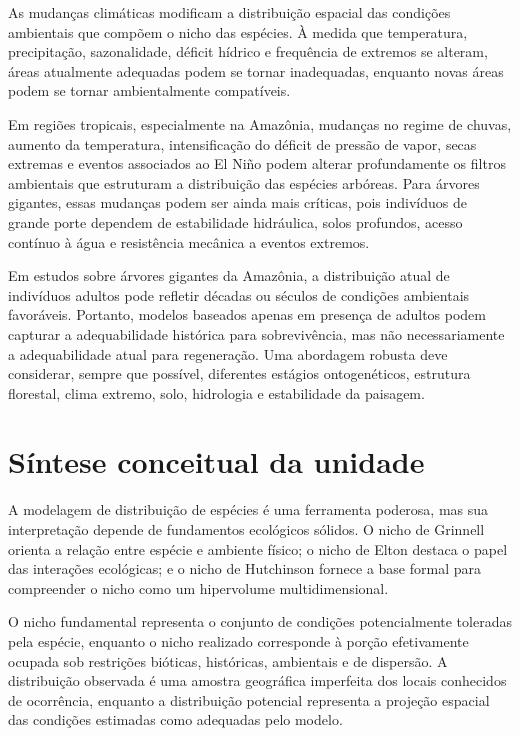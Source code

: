 \documentclass{ueap-sdm}
\begin{document}
As mudanças climáticas modificam a distribuição espacial das condições ambientais que compõem o nicho das espécies. À medida que temperatura, precipitação, sazonalidade, déficit hídrico e frequência de extremos se alteram, áreas atualmente adequadas podem se tornar inadequadas, enquanto novas áreas podem se tornar ambientalmente compatíveis.

Em regiões tropicais, especialmente na Amazônia, mudanças no regime de chuvas, aumento da temperatura, intensificação do déficit de pressão de vapor, secas extremas e eventos associados ao El Niño podem alterar profundamente os filtros ambientais que estruturam a distribuição das espécies arbóreas. Para árvores gigantes, essas mudanças podem ser ainda mais críticas, pois indivíduos de grande porte dependem de estabilidade hidráulica, solos profundos, acesso contínuo à água e resistência mecânica a eventos extremos.

\begin{aplicacao}
Em estudos sobre árvores gigantes da Amazônia, a distribuição atual de indivíduos adultos pode refletir décadas ou séculos de condições ambientais favoráveis. Portanto, modelos baseados apenas em presença de adultos podem capturar a adequabilidade histórica para sobrevivência, mas não necessariamente a adequabilidade atual para regeneração. Uma abordagem robusta deve considerar, sempre que possível, diferentes estágios ontogenéticos, estrutura florestal, clima extremo, solo, hidrologia e estabilidade da paisagem.
\end{aplicacao}

\section{Síntese conceitual da unidade}

A modelagem de distribuição de espécies é uma ferramenta poderosa, mas sua interpretação depende de fundamentos ecológicos sólidos. O nicho de Grinnell orienta a relação entre espécie e ambiente físico; o nicho de Elton destaca o papel das interações ecológicas; e o nicho de Hutchinson fornece a base formal para compreender o nicho como um hipervolume multidimensional.

O nicho fundamental representa o conjunto de condições potencialmente toleradas pela espécie, enquanto o nicho realizado corresponde à porção efetivamente ocupada sob restrições bióticas, históricas, ambientais e de dispersão. A distribuição observada é uma amostra geográfica imperfeita dos locais conhecidos de ocorrência, enquanto a distribuição potencial representa a projeção espacial das condições estimadas como adequadas pelo modelo.
\end{document}
